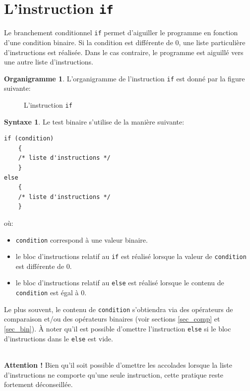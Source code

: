 \documentclass[a4paper,11pt]{book}
\newenvironment{warning} 
   {~\\ \textbf{Attention !}}{\\}
\theoremstyle{definition}
\newtheorem*{syntaxe}{Syntaxe}
\newtheorem*{org}{Organigramme}
\begin{document}
\section{L'instruction \texttt{if}}
 Le branchement conditionnel \texttt{if} permet d'aiguiller le
programme en fonction d'une condition binaire. Si la condition est différente de 0, une liste particulière d'instructions est réalisée. Dans le cas contraire, le programme est aiguillé vers une autre liste d'instructions.

\begin{org}L'organigramme de l'instruction \texttt{if} est donné par la figure suivante:
\begin{figure}[!h]
\centering
{}
\caption{L'instruction \texttt{if}}\label{diag}
\end{figure}
\end{org}

\begin{syntaxe}Le test binaire s'utilise de la manière suivante:
\begin{lstlisting}
if (condition)
    {
    /* liste d'instructions */
    }
else
    {
    /* liste d'instructions */
    }
\end{lstlisting}
où:
\begin{itemize}
\item  \texttt{condition} correspond à une valeur binaire.
\item le bloc d'instructions relatif au \texttt{if} est réalisé lorsque la valeur de \texttt{condition} est différente de 0.
\item le bloc d'instructions relatif au \texttt{else} est réalisé lorsque le contenu de \texttt{condition} est égal à 0.\\
\end{itemize}
Le plus souvent, le contenu de \texttt{condition} s'obtiendra via des opérateurs de
comparaison et/ou des opérateurs binaires (voir sections
\ref{sec_comp} et \ref{sec_bin}). \`A noter qu'il est possible
d'omettre l'instruction \texttt{else} si le bloc d'instructions
dans le \texttt{else} est vide.
\end{syntaxe}
\begin{warning}
Bien qu'il soit possible d'omettre les accolades lorsque la liste d'instructions ne comporte qu'une seule instruction, cette pratique reste fortement déconseillée.
\end{warning}
\end{document}
